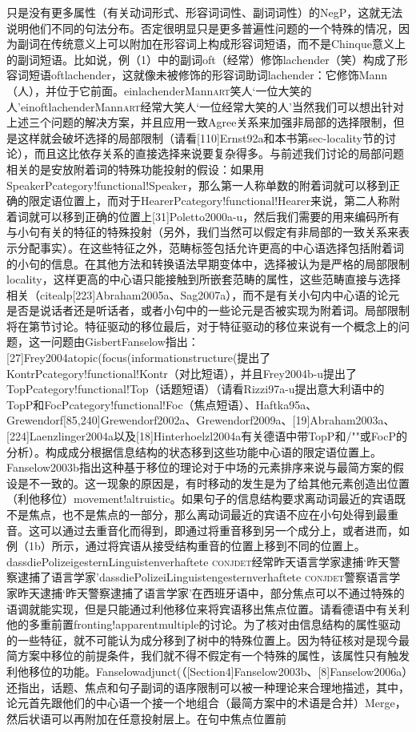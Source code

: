 只是没有更多属性（有关动词形式、形容词词性、副词词性）的NegP，这就无法说明他们不同的句法分布。否定很明显只是更多普遍性问题的一个特殊的情况，因为副词在传统意义上可以附加在形容词上构成形容词短语，而不是Chinque意义上的副词短语。比如说，例（1）中的副词oft（经常）修饰lachender（笑）构成了形容词短语oftlachender，这就像未被修饰的形容词助词lachender：它修饰Mann（人），并位于它前面。einlachenderMann\textsc{art}笑人`一位大笑的人'einoftlachenderMann\textsc{art}经常大笑人`一位经常大笑的人'当然我们可以想出针对上述三个问题的解决方案，并且应用一致Agree关系来加强非局部的选择限制，但是这样就会破坏选择的局部限制（请看[110]Ernst92a和本书第sec-locality节的讨论），而且这比依存关系的直接选择来说要复杂得多。与前述我们讨论的局部问题相关的是安放附着词的特殊功能投射的假设：如果用SpeakerPcategory!functional!Speaker，那么第一人称单数的附着词就可以移到正确的限定语位置上，而对于HearerPcategory!functional!Hearer来说，第二人称附着词就可以移到正确的位置上[31]Poletto2000a-u，然后我们需要的用来编码所有与小句有关的特征的特殊投射（另外，我们当然可以假定有非局部的一致关系来表示分配事实）。在这些特征之外，范畴标签包括允许更高的中心语选择包括附着词的小句的信息。在其他方法和转换语法早期变体中，选择被认为是严格的局部限制locality，这样更高的中心语只能接触到所嵌套范畴的属性，这些范畴直接与选择相关（citealp[223]Abraham2005a、Sag2007a），而不是有关小句内中心语的论元是否是说话者还是听话者，或者小句中的一些论元是否被实现为附着词。局部限制将在第节讨论。特征驱动的移位最后，对于特征驱动的移位来说有一个概念上的问题，这一问题由GisbertFanselow指出：[27]Frey2004atopic(focus(informationstructure(提出了KontrPcategory!functional!Kontr（对比短语），并且Frey2004b-u提出了TopPcategory!functional!Top（话题短语）（请看Rizzi97a-u提出意大利语中的TopP和FocPcategory!functional!Foc（焦点短语）、Haftka95a、Grewendorf[85,240]Grewendorf2002a、Grewendorf2009a、[19]Abraham2003a、[224]Laenzlinger2004a以及[18]Hinterhoelzl2004a有关德语中带TopP和/""或FocP的分析）。构成成分根据信息结构的状态移到这些功能中心语的限定语位置上。Fanselow2003b指出这种基于移位的理论对于中场的元素排序来说与最简方案的假设是不一致的。这一现象的原因是，有时移动的发生是为了给其他元素创造出位置（利他移位）movement!altruistic。如果句子的信息结构要求离动词最近的宾语既不是焦点，也不是焦点的一部分，那么离动词最近的宾语不应在小句处得到最重音。这可以通过去重音化而得到，即通过将重音移到另一个成分上，或者进而，如例（1b）所示，通过将宾语从接受结构重音的位置上移到不同的位置上。dassdiePolizeigesternLinguistenverhaftete	\textsc{conj}\textsc{det}经常昨天语言学家逮捕`昨天警察逮捕了语言学家'dassdiePolizeiLinguistengesternverhaftete	\textsc{conj}\textsc{det}警察语言学家昨天逮捕`昨天警察逮捕了语言学家'在西班牙语中，部分焦点可以不通过特殊的语调就能实现，但是只能通过利他移位来将宾语移出焦点位置。请看德语中有关利他的多重前置fronting!apparentmultiple的讨论。为了核对由信息结构的属性驱动的一些特征，就不可能认为成分移到了树中的特殊位置上。因为特征核对是现今最简方案中移位的前提条件，我们就不得不假定有一个特殊的属性，该属性只有触发利他移位的功能。Fanselowadjunct(（[Section4]Fanselow2003b、[8]Fanselow2006a）还指出，话题、焦点和句子副词的语序限制可以被一种理论来合理地描述，其中，论元首先跟他们的中心语一个接一个地组合（最简方案中的术语是合并）Merge，然后状语可以再附加在任意投射层上。在句中焦点位置前